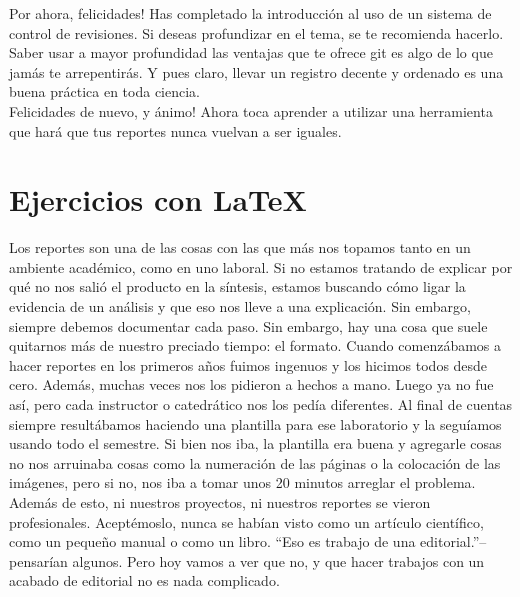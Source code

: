 \documentclass[10pt,letterpaper]{article}
\begin{document}
Por ahora, felicidades! Has completado la introducci\'on al uso de un sistema de control de revisiones. Si deseas profundizar en el tema, se te recomienda hacerlo. Saber usar a mayor profundidad las ventajas que te ofrece git es algo de lo que jam\'as te arrepentir\'as. Y pues claro, llevar un registro decente y ordenado es una buena pr\'actica en toda ciencia.\\

Felicidades de nuevo, y \'animo! Ahora toca aprender a utilizar una herramienta que har\'a que tus reportes nunca vuelvan a ser iguales.

\newpage
\section{Ejercicios con \LaTeX\ }
Los reportes son una de las cosas con las que m\'as nos topamos tanto en un ambiente acad\'emico, como en uno laboral. Si no estamos tratando de explicar por qu\'e no nos sali\'o el producto en la s\'intesis, estamos buscando c\'omo ligar la evidencia de un an\'alisis y que eso nos lleve a una explicaci\'on. Sin embargo, siempre debemos documentar cada paso. Sin embargo, hay una cosa que suele quitarnos m\'as de nuestro preciado tiempo: el formato. Cuando comenz\'abamos a hacer reportes en los primeros a\~nos fuimos ingenuos y los hicimos todos desde cero. Adem\'as, muchas veces nos los pidieron a hechos a mano. Luego ya no fue as\'i, pero cada instructor o catedr\'atico nos los ped\'ia diferentes. Al final de cuentas siempre result\'abamos haciendo una plantilla para ese laboratorio y la segu\'iamos usando todo el semestre. Si bien nos iba, la plantilla era buena y agregarle cosas no nos arruinaba cosas como la numeraci\'on de las p\'aginas o la colocaci\'on de las im\'agenes, pero si no, nos iba a tomar unos 20 minutos arreglar el problema. Adem\'as de esto, ni nuestros proyectos, ni nuestros reportes se vieron profesionales. Acept\'emoslo, nunca se hab\'ian visto como un art\'iculo cient\'ifico, como un peque\~no manual o como un libro. ``Eso es trabajo de una editorial.''--pensar\'ian algunos. Pero hoy vamos a ver que no, y que hacer trabajos con un acabado de editorial no es nada complicado.\\
\end{document}

